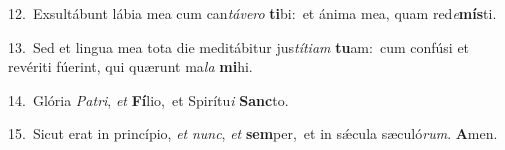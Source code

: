 {\numbfont\textcolor{\numbcolor}{12.}}~Exsultábunt lábia mea cum can\-\textit{tá}\-\textit{ve}\textit{ro} \textbf{ti}\-bi:~\star et ánima mea, quam red\-\textit{e}\-\textbf{mís}ti.\par
{\numbfont\textcolor{\numbcolor}{13.}}~Sed et lingua mea tota die meditábitur jus\-\textit{tí}\-\textit{ti}\textit{am} \textbf{tu}\-am:~\star cum confúsi et revériti fúerint, qui quærunt ma\textit{la} \textbf{mi}\-hi.\par
{\numbfont\textcolor{\numbcolor}{14.}}~Glória \textit{Pa}\-\textit{tri}, \textit{et} \textbf{Fí}\-lio,~\star et Spirítu\textit{i} \textbf{Sanc}\-to.\par
{\numbfont\textcolor{\numbcolor}{15.}}~Sicut erat in princípio, \textit{et} \textit{nunc}\-, \textit{et} \textbf{sem}\-per,~\star et in sǽcula sæculó\-\textit{rum}\-. \textbf{A}\-men.\par
